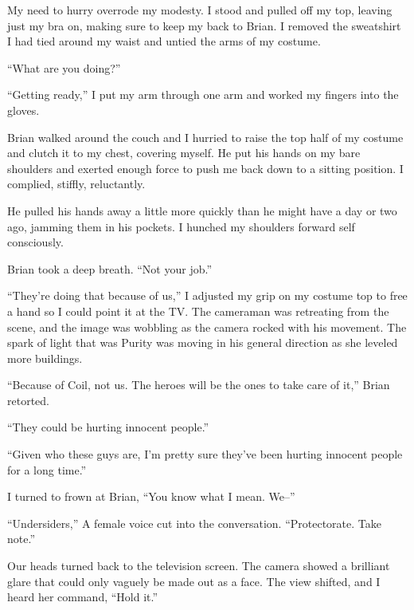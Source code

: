 My need to hurry overrode my modesty.  I stood and pulled off my top, leaving just my bra on, making sure to keep my back to Brian.   I removed the sweatshirt I had tied around my waist and untied the arms of my costume.



``What are you doing?''



``Getting ready,'' I put my arm through one arm and worked my fingers into the gloves.



Brian walked around the couch and I hurried to raise the top half of my costume and clutch it to my chest, covering myself.  He put his hands on my bare shoulders and exerted enough force to push me back down to a sitting position.  I complied, stiffly, reluctantly.



He pulled his hands away a little more quickly than he might have a day or two ago, jamming them in his pockets.  I hunched my shoulders forward self consciously.



Brian took a deep breath.  ``Not your job.''



``They're doing that because of us,'' I adjusted my grip on my costume top to free a hand so I could point it at the TV.  The cameraman was retreating from the scene, and the image was wobbling as the camera rocked with his movement.  The spark of light that was Purity was moving in his general direction as she leveled more buildings.



``Because of Coil, not us.  The heroes will be the ones to take care of it,'' Brian retorted.



``They could be hurting innocent people.''



``Given who these guys are, I'm pretty sure they've been hurting innocent people for a long time.''



I turned to frown at Brian, ``You know what I mean.  We--''



``Undersiders,'' A female voice cut into the conversation.  ``Protectorate.   Take note.''



Our heads turned back to the television screen.  The camera showed a brilliant glare that could only vaguely be made out as a face.  The view shifted, and I heard her command, ``Hold it.''



